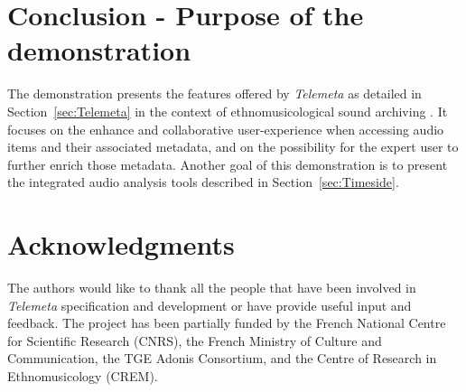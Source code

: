 \documentclass{aes53i}
\begin{document}
\section{Conclusion - Purpose of the demonstration}\vspace{-0.1cm}
The demonstration presents the features offered by \emph{Telemeta} as detailed in Section~\ref{sec:Telemeta} in the context of ethnomusicological sound archiving \cite{telemetaCREM}. It focuses on the enhance and collaborative user-experience when accessing audio items and their associated metadata, and on the possibility for the expert user to further enrich those metadata.
Another goal of this demonstration is to present the integrated audio analysis tools described in Section~\ref{sec:Timeside}.


\section*{Acknowledgments} 
The authors would like to thank all the people that have been involved in \emph{Telemeta} specification and development or have provide useful input and feedback. 
The project has been partially funded by the French National Centre for Scientific Research (CNRS), the French Ministry of Culture and Communication, the TGE Adonis Consortium, and the Centre of Research in Ethnomusicology (CREM).




\end{document}
